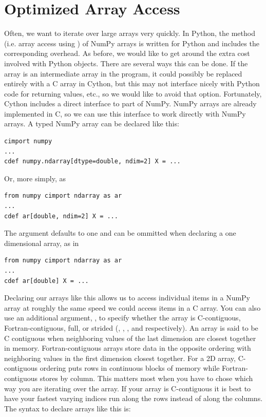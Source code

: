 \section*{Optimized Array Access}
Often, we want to iterate over large arrays very quickly.
In Python, the  method (i.e. array access using \li{[ ]}) of NumPy arrays is written for Python and includes the corresponding overhead.
As before, we would like to get around the extra cost involved with Python objects.
There are several ways this can be done.
If the array is an intermediate array in the program, it could possibly be replaced entirely with a C array in Cython, but this may not interface nicely with Python code for returning values, etc., so we would like to avoid that option.
Fortunately, Cython includes a direct interface to part of NumPy.
NumPy arrays are already implemented in C, so we can use this interface to work directly with NumPy arrays.
A typed NumPy array can be declared like this:
\begin{lstlisting}
cimport numpy
...
cdef numpy.ndarray[dtype=double, ndim=2] X = ...
\end{lstlisting}
Or, more simply, as
\begin{lstlisting}
from numpy cimport ndarray as ar
...
cdef ar[double, ndim=2] X = ...
\end{lstlisting}
The  argument defaults to one and can be ommitted when declaring a one dimensional array, as in
\begin{lstlisting}
from numpy cimport ndarray as ar
...
cdef ar[double] X = ...
\end{lstlisting}
Declaring our arrays like this allows us to access individual items in a NumPy array at roughly the same speed we could access items in a C array.
You can also use an additional argument, , to specify whether the array is C-contiguous, Fortran-contiguous, full, or strided (, , , and  respectively).
An array is said to be C contiguous when neighboring values of the last dimension are closest together in memory.
Fortran-contiguous arrays store data in the opposite ordering with neighboring values in the first dimension closest together.
For a 2D array, C-contiguous ordering puts rows in continuous blocks of memory while Fortran-contiguous stores by column.
This matters most when you have to chose which way you are iterating over the array.
If your array is C-contiguous it is best to have your fastest varying indices run along the rows instead of along the columns.
The syntax to declare arrays like this is:
